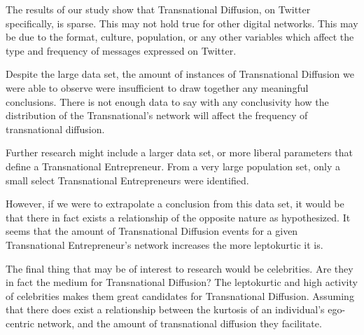 The results of our study show that Transnational Diffusion, on Twitter
specifically, is sparse. This may not hold true for other digital
networks. This may be due to the format, culture, population, or any
other variables which affect the type and frequency of messages
expressed on Twitter.

Despite the large data set, the amount of instances of Transnational
Diffusion we were able to observe were insufficient to draw together
any meaningful conclusions. There is not enough data to say with any
conclusivity how the distribution of the Transnational's network will
affect the frequency of transnational diffusion.

Further research might include a larger data set, or more liberal
parameters that define a Transnational Entrepreneur. From a very large
population set, only a small select Transnational Entrepreneurs were
identified.

However, if we were to extrapolate a conclusion from this data set, it
would be that there in fact exists a relationship of the opposite
nature as hypothesized. It seems that the amount of Transnational
Diffusion events for a given Transnational Entrepreneur's network
increases the more leptokurtic it is.

The final thing that may be of interest to research would be
celebrities. Are they in fact the medium for Transnational Diffusion?
The leptokurtic and high activity of celebrities makes them great
candidates for Transnational Diffusion. Assuming that there does exist
a relationship between the kurtosis of an individual's ego-centric
network, and the amount of transnational diffusion they facilitate.
